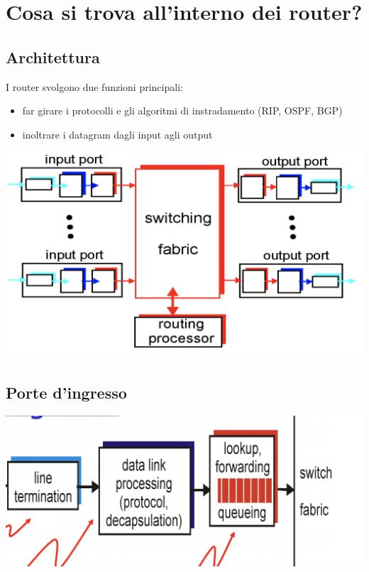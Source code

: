 \documentclass{report}
\begin{document}
\hypertarget{header-n48}{%
\section{Cosa si trova all'interno dei router?}\label{header-n48}}

\hypertarget{header-n49}{%
\subsection{Architettura}\label{header-n49}}

I router svolgono due funzioni principali:

\begin{itemize}
\item
  far girare i protocolli e gli algoritmi di instradamento (RIP, OSPF,
  BGP)
\item
  inoltrare i datagram dagli input agli output
\end{itemize}

\begin{center}
		\includegraphics[width=0.7\linewidth]{architettura-router}
	\end{center}

\hypertarget{header-n57}{%
\subsection{Porte d'ingresso}\label{header-n57}}

\begin{center}
		\includegraphics[width=0.7\linewidth]{ingresso-router}
	\end{center}
\end{document}
